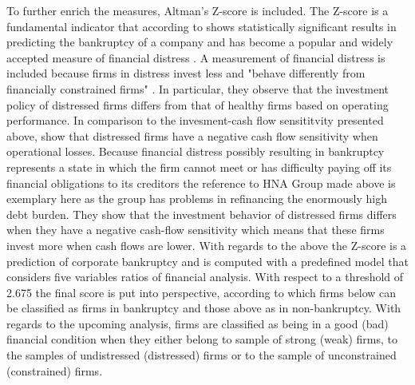 \documentclass[12pt]{article}
\begin{document}
To further enrich the measures, Altman's Z-score is included. The Z-score is a fundamental indicator that according to \citet[p.5]{Mohr2012} shows statistically significant results in predicting the bankruptcy of a company and has become a popular and widely accepted measure of financial distress \citep[p.2903]{Campbell2008}. A measurement of financial distress is included because firms in distress invest less and "behave differently from financially constrained firms" \citep[p.461]{Bhagat2005}. In particular, they observe that the investment policy of distressed firms differs from that of healthy firms based on operating performance. In comparison to the invesment-cash flow sensititvity presented above, \citet{Bhagat2005} show that distressed firms have a negative cash flow sensitivity when operational losses.
	 Because financial distress possibly resulting in bankruptcy represents a state in which the firm cannot meet or has difficulty paying off its financial obligations to its creditors the reference to HNA Group made above is exemplary here as the group has problems in refinancing the enormously high debt burden. 
They show that the investment behavior of distressed firms differs when they have a negative cash-flow sensitivity which means that these firms invest more when cash flows are lower. With regards to the above the Z-score is a prediction of corporate bankruptcy \citep[p.594]{Altman} and is computed with a predefined model that considers five variables ratios of financial analysis. With respect to a threshold of 2.675 \citep[p.607]{Altman1968} the final score is put into perspective, according to which firms below can be classified as firms in bankruptcy and those above as in non-bankruptcy. 
With regards to the upcoming analysis, firms are classified as being in a good (bad) financial condition when they either belong to sample of strong (weak) firms, to the samples of undistressed (distressed) firms or to the sample of unconstrained (constrained) firms.
\end{document}

